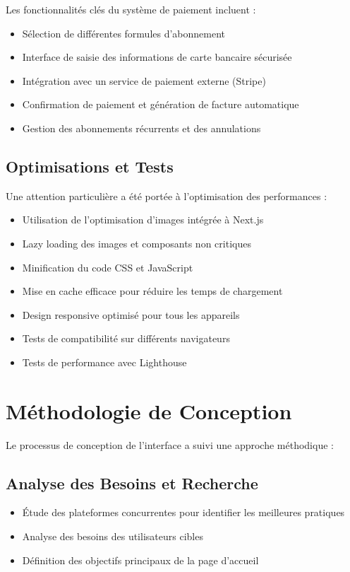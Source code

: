 Les fonctionnalités clés du système de paiement incluent :
\begin{itemize}
  \item Sélection de différentes formules d'abonnement
  \item Interface de saisie des informations de carte bancaire sécurisée
  \item Intégration avec un service de paiement externe (Stripe)
  \item Confirmation de paiement et génération de facture automatique
  \item Gestion des abonnements récurrents et des annulations
\end{itemize}

\subsection{Optimisations et Tests}
Une attention particulière a été portée à l'optimisation des performances :
\begin{itemize}
  \item Utilisation de l'optimisation d'images intégrée à Next.js
  \item Lazy loading des images et composants non critiques
  \item Minification du code CSS et JavaScript
  \item Mise en cache efficace pour réduire les temps de chargement
  \item Design responsive optimisé pour tous les appareils
  \item Tests de compatibilité sur différents navigateurs
  \item Tests de performance avec Lighthouse
\end{itemize}

\section{Méthodologie de Conception}

Le processus de conception de l'interface a suivi une approche méthodique :

\subsection{Analyse des Besoins et Recherche}
\begin{itemize}
  \item Étude des plateformes concurrentes pour identifier les meilleures pratiques
  \item Analyse des besoins des utilisateurs cibles
  \item Définition des objectifs principaux de la page d'accueil
\end{itemize}

